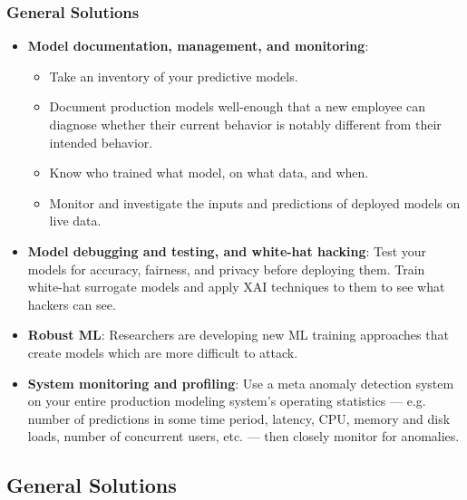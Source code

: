 \documentclass[11pt,
               aspectratio=169,
               hyperref={colorlinks}
               ]{beamer}
\begin{document}
			\begin{frame}
				\frametitle{General Solutions}
				\scriptsize
				\begin{itemize}
					\item \textbf{Model documentation, management, and monitoring}:
						\begin{itemize}\scriptsize
							\item Take an inventory of your predictive models. 
							\item Document production models well-enough that a new employee can diagnose whether their current behavior is notably different from their intended behavior. 
							\item Know who trained what model, on what data, and when.
							\item Monitor and investigate the inputs and predictions of deployed models on live data.	
						\end{itemize}
					\item \textbf{Model debugging and testing, and white-hat hacking}: Test your models for accuracy, fairness, and privacy before deploying them. Train white-hat surrogate models and apply XAI techniques to them to see what hackers can see. 
					\item \textbf{Robust ML}: Researchers are developing new ML training approaches that create models which are more difficult to attack. 
					\item \textbf{System monitoring and profiling}: Use a meta anomaly detection system on your entire production modeling system’s operating statistics — e.g. number of predictions in some time period, latency, CPU, memory and disk loads, number of concurrent users, etc. — then closely monitor for anomalies.
				\end{itemize}
				\normalsize
			\end{frame}

		\subsection{General Solutions}
\end{document}

